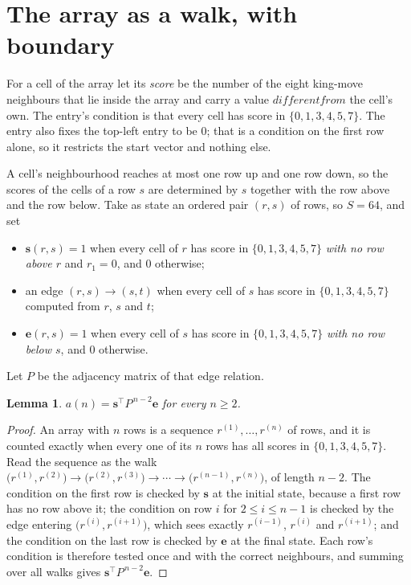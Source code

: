 \documentclass[11pt,a4paper]{article}
\theoremstyle{plain}
\newtheorem{lemma}[theorem]{Lemma}
\theoremstyle{definition}
\begin{document}
\section{The array as a walk, with boundary}

For a cell of the array let its \emph{score} be the number of the eight king-move neighbours that lie inside
the array and carry a value $different from$ the cell's own. The entry's condition is that every cell
has score in $\{0,1,3,4,5,7\}$. The entry also fixes the top-left entry to be $0$; that is a condition on the first row alone, so it restricts the start vector and nothing else.

A cell's neighbourhood reaches at most one row up and one row down, so the scores of the
cells of a row $s$ are determined by $s$ together with the row above and the row below.
Take as state an ordered pair $(r,s)$ of rows, so $S=64$, and set
\begin{itemize}
\item $\mathbf{s}(r,s)=1$ when every cell of $r$ has score in $\{0,1,3,4,5,7\}$ \emph{with no row
above $r$} and $r_1=0$, and $0$ otherwise;
\item an edge $(r,s)\to(s,t)$ when every cell of $s$ has score in $\{0,1,3,4,5,7\}$ computed from
$r$, $s$ and $t$;
\item $\mathbf{e}(r,s)=1$ when every cell of $s$ has score in $\{0,1,3,4,5,7\}$ \emph{with no row
below $s$}, and $0$ otherwise.
\end{itemize}
Let $P$ be the adjacency matrix of that edge relation.

\begin{lemma}\label{lem:walk}
$a(n)=\mathbf{s}^{\!\top}P^{\,n-2}\mathbf{e}$ for every $n\ge2$.
\end{lemma}

\begin{proof}
An array with $n$ rows is a sequence $r^{(1)},\dots,r^{(n)}$ of rows, and it is counted
exactly when every one of its $n$ rows has all scores in $\{0,1,3,4,5,7\}$. Read the sequence as the
walk $\bigl(r^{(1)},r^{(2)}\bigr)\to\bigl(r^{(2)},r^{(3)}\bigr)\to\cdots\to
\bigl(r^{(n-1)},r^{(n)}\bigr)$, of length $n-2$. The condition on the first row is
checked by $\mathbf{s}$ at the initial state, because a first row has no row above it; the
condition on row $i$ for $2\le i\le n-1$ is checked by the edge entering
$\bigl(r^{(i)},r^{(i+1)}\bigr)$, which sees exactly $r^{(i-1)}$, $r^{(i)}$ and
$r^{(i+1)}$; and the condition on the last row is checked by $\mathbf{e}$ at the final
state. Each row's condition is therefore tested once and with the correct neighbours, and
summing over all walks gives $\mathbf{s}^{\!\top}P^{\,n-2}\mathbf{e}$.
\end{proof}
\end{document}
